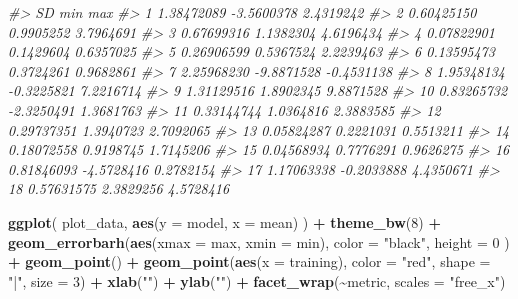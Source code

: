\documentclass[
]{book}
\newenvironment{Shaded}{\begin{snugshade}}{\end{snugshade}}
\newcommand{\CommentTok}[1]{\textcolor[rgb]{0.56,0.35,0.01}{\textit{#1}}}
\newcommand{\DataTypeTok}[1]{\textcolor[rgb]{0.13,0.29,0.53}{#1}}
\newcommand{\DecValTok}[1]{\textcolor[rgb]{0.00,0.00,0.81}{#1}}
\newcommand{\KeywordTok}[1]{\textcolor[rgb]{0.13,0.29,0.53}{\textbf{#1}}}
\newcommand{\NormalTok}[1]{#1}
\newcommand{\OperatorTok}[1]{\textcolor[rgb]{0.81,0.36,0.00}{\textbf{#1}}}
\newcommand{\StringTok}[1]{\textcolor[rgb]{0.31,0.60,0.02}{#1}}
\begin{document}
\begin{Shaded}
\begin{Highlighting}[]
\CommentTok{\#>            SD        min        max}
\CommentTok{\#> 1  1.38472089 {-}3.5600378  2.4319242}
\CommentTok{\#> 2  0.60425150  0.9905252  3.7964691}
\CommentTok{\#> 3  0.67699316  1.1382304  4.6196434}
\CommentTok{\#> 4  0.07822901  0.1429604  0.6357025}
\CommentTok{\#> 5  0.26906599  0.5367524  2.2239463}
\CommentTok{\#> 6  0.13595473  0.3724261  0.9682861}
\CommentTok{\#> 7  2.25968230 {-}9.8871528 {-}0.4531138}
\CommentTok{\#> 8  1.95348134 {-}0.3225821  7.2216714}
\CommentTok{\#> 9  1.31129516  1.8902345  9.8871528}
\CommentTok{\#> 10 0.83265732 {-}2.3250491  1.3681763}
\CommentTok{\#> 11 0.33144744  1.0364816  2.3883585}
\CommentTok{\#> 12 0.29737351  1.3940723  2.7092065}
\CommentTok{\#> 13 0.05824287  0.2221031  0.5513211}
\CommentTok{\#> 14 0.18072558  0.9198745  1.7145206}
\CommentTok{\#> 15 0.04568934  0.7776291  0.9626275}
\CommentTok{\#> 16 0.81846093 {-}4.5728416  0.2782154}
\CommentTok{\#> 17 1.17063338 {-}0.2033888  4.4350671}
\CommentTok{\#> 18 0.57631575  2.3829256  4.5728416}
\end{Highlighting}
\end{Shaded}

\begin{Shaded}
\begin{Highlighting}[]
\KeywordTok{ggplot}\NormalTok{(}
\NormalTok{  plot\_data,}
  \KeywordTok{aes}\NormalTok{(}\DataTypeTok{y =}\NormalTok{ model, }\DataTypeTok{x =}\NormalTok{ mean)}
\NormalTok{) }\OperatorTok{+}
\StringTok{  }\KeywordTok{theme\_bw}\NormalTok{(}\DecValTok{8}\NormalTok{) }\OperatorTok{+}
\StringTok{  }\KeywordTok{geom\_errorbarh}\NormalTok{(}\KeywordTok{aes}\NormalTok{(}\DataTypeTok{xmax =}\NormalTok{ max, }\DataTypeTok{xmin =}\NormalTok{ min),}
    \DataTypeTok{color =} \StringTok{"black"}\NormalTok{,}
    \DataTypeTok{height =} \DecValTok{0}
\NormalTok{  ) }\OperatorTok{+}
\StringTok{  }\KeywordTok{geom\_point}\NormalTok{() }\OperatorTok{+}
\StringTok{  }\KeywordTok{geom\_point}\NormalTok{(}\KeywordTok{aes}\NormalTok{(}\DataTypeTok{x =}\NormalTok{ training), }\DataTypeTok{color =} \StringTok{"red"}\NormalTok{, }\DataTypeTok{shape =} \StringTok{"|"}\NormalTok{, }\DataTypeTok{size =} \DecValTok{3}\NormalTok{) }\OperatorTok{+}
\StringTok{  }\KeywordTok{xlab}\NormalTok{(}\StringTok{""}\NormalTok{) }\OperatorTok{+}
\StringTok{  }\KeywordTok{ylab}\NormalTok{(}\StringTok{""}\NormalTok{) }\OperatorTok{+}
\StringTok{  }\KeywordTok{facet\_wrap}\NormalTok{(}\OperatorTok{\textasciitilde{}}\NormalTok{metric, }\DataTypeTok{scales =} \StringTok{"free\_x"}\NormalTok{)}
\end{Highlighting}
\end{Shaded}
\end{document}
